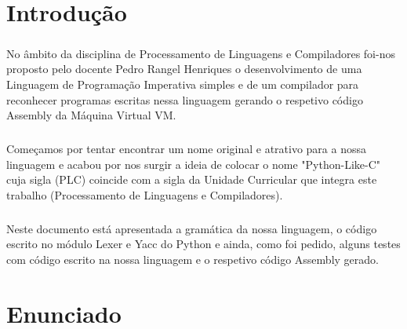 \documentclass[11pt,a4paper]{report}
\begin{document}
    \tableofcontents

    \pagebreak


    \chapter{Introdução}
    \paragraph{}
    No âmbito da disciplina de Processamento de Linguagens e Compiladores foi-nos proposto pelo docente Pedro Rangel Henriques o desenvolvimento de uma Linguagem de Programação Imperativa simples e de um compilador para reconhecer programas escritas nessa linguagem gerando o respetivo código Assembly da Máquina Virtual VM.
    \paragraph{}
    Começamos por tentar encontrar um nome original e atrativo para a nossa linguagem e acabou por nos surgir a ideia de colocar o nome "Python-Like-C" cuja sigla (PLC) coincide com a sigla da Unidade Curricular que integra este trabalho (Processamento de Linguagens e Compiladores).
    \paragraph{}
    Neste documento está apresentada a gramática da nossa linguagem, o código escrito no módulo Lexer e Yacc do Python e ainda, como foi pedido, alguns testes com código escrito na nossa linguagem e o respetivo código Assembly gerado.


    \chapter{Enunciado}
\end{document}
